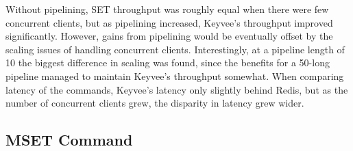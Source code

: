 \documentclass[english,10pt,twocolumn]{article}
\begin{document}
Without pipelining, SET throughput was roughly equal when there were few concurrent clients, but as pipelining increased, Keyvee's throughput improved significantly. 
However, gains from pipelining would be eventually offset by the scaling issues of handling concurrent clients.
Interestingly, at a pipeline length of 10 the biggest difference in scaling was found, since the benefits for a 50-long pipeline managed to maintain Keyvee's throughput somewhat.
When comparing latency of the commands, Keyvee's latency only slightly behind Redis, but as the number of concurrent clients grew, the disparity in latency grew wider.

\subsection{MSET Command}
\end{document}
